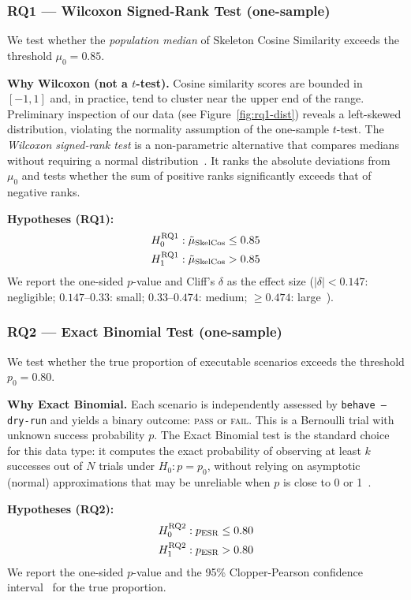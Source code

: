 \subsubsection{RQ1 — Wilcoxon Signed-Rank Test (one-sample)}

We test whether the \emph{population median} of Skeleton Cosine Similarity exceeds
the threshold $\mu_0 = 0.85$.

\textbf{Why Wilcoxon (not a $t$-test).}
Cosine similarity scores are bounded in $[-1, 1]$ and, in practice, tend to cluster
near the upper end of the range.
Preliminary inspection of our data (see Figure~\ref{fig:rq1-dist}) reveals a
left-skewed distribution, violating the normality assumption of the one-sample $t$-test.
The \emph{Wilcoxon signed-rank test} is a non-parametric alternative that compares
medians without requiring a normal distribution~\cite{arcuri2011practical}.
It ranks the absolute deviations from $\mu_0$ and tests whether the sum of positive
ranks significantly exceeds that of negative ranks.

\textbf{Hypotheses (RQ1):}
\begin{align}
  H_0^{\text{RQ1}} &: \tilde{\mu}_{\text{SkelCos}} \leq 0.85 \notag \\
  H_1^{\text{RQ1}} &: \tilde{\mu}_{\text{SkelCos}} > 0.85 \notag
\end{align}
We report the one-sided $p$-value and Cliff's $\delta$ as the effect size
($|\delta| < 0.147$: negligible; $0.147$--$0.33$: small; $0.33$--$0.474$: medium;
$\geq 0.474$: large~\cite{romano2006exploring}).

\subsubsection{RQ2 — Exact Binomial Test (one-sample)}

We test whether the true proportion of executable scenarios exceeds the threshold
$p_0 = 0.80$.

\textbf{Why Exact Binomial.}
Each scenario is independently assessed by \texttt{behave --dry-run} and yields a
binary outcome: \textsc{pass} or \textsc{fail}.
This is a Bernoulli trial with unknown success probability $p$.
The Exact Binomial test is the standard choice for this data type: it computes the
exact probability of observing at least $k$ successes out of $N$ trials under
$H_0: p = p_0$, without relying on asymptotic (normal) approximations that may be
unreliable when $p$ is close to 0 or 1~\cite{agresti2002categorical}.

\textbf{Hypotheses (RQ2):}
\begin{align}
  H_0^{\text{RQ2}} &: p_{\text{ESR}} \leq 0.80 \notag \\
  H_1^{\text{RQ2}} &: p_{\text{ESR}} > 0.80 \notag
\end{align}
We report the one-sided $p$-value and the 95\% Clopper-Pearson confidence
interval~\cite{clopper1934use} for the true proportion.
